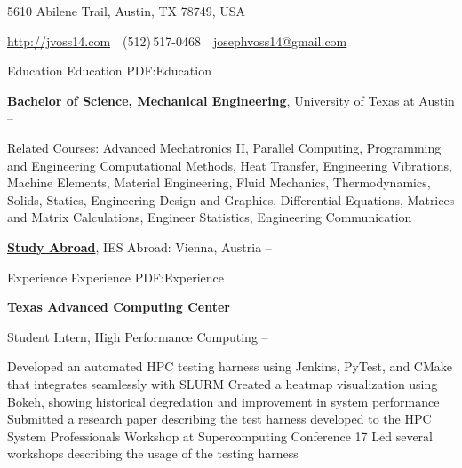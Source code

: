 \documentclass[letterpaper,MMMyyyy,nonstopmode]{simpleresumecv}
\newcommand{\CVAuthor}{Joseph Voss}
\newcommand{\CVWebpage}{http://jvoss14.com}
\begin{document}

\Title{\CVAuthor}

\begin{SubTitle}
{5610 Abilene Trail, Austin, TX 78749, USA}
\par
\href{\CVWebpage}
{\url{\CVWebpage}}
\,\SubBulletSymbol\,
(512)\,517-0468
\,\SubBulletSymbol\,
\href{mailto:josephvoss14@gmail.com}
{josephvoss14@gmail.com}

\end{SubTitle}

\begin{Body}


\Section
{Education}
{Education}
{PDF:Education}

\Entry
{\textbf{Bachelor of Science, Mechanical Engineering}},
University of Texas at Austin
\hfill
{} --

\Gap
\begin{Detail}
Related Courses:
Advanced Mechatronics II, Parallel Computing, Programming and Engineering Computational Methods, Heat Transfer, Engineering Vibrations, Machine Elements, Material Engineering, Fluid Mechanics, Thermodynamics, Solids, Statics, Engineering Design and Graphics, Differential Equations, Matrices and Matrix Calculations, Engineer Statistics, Engineering Communication
\end{Detail}

\BigGap
\Entry
\href{http://sites.utexas.edu/studyabroad/self-discovery-in-austria/}
{\textbf{Study Abroad}},
IES Abroad: Vienna, Austria
\hfill
{} -- 


\Section
{Experience}
{Experience}
{PDF:Experience}

\Entry
\href{http://tacc.utexas.edu}
{\textbf{Texas Advanced Computing Center}}

\Gap
\BulletItem
Student Intern, High Performance Computing
\hfill
{} --
\begin{Detail}
\SubBulletItem
Developed an automated HPC testing harness using Jenkins, PyTest, and CMake \newline
that integrates seamlessly with SLURM
\SubBulletItem
Created a heatmap visualization using Bokeh, showing historical degredation and \newline 
improvement in system performance
\SubBulletItem
Submitted a research paper describing the test harness developed 
\newline to the HPC System Professionals Workshop at Supercomputing Conference 17
\SubBulletItem
Led several workshops describing the usage of the testing harness
\end{Detail}


\end{Body}
\end{document}
